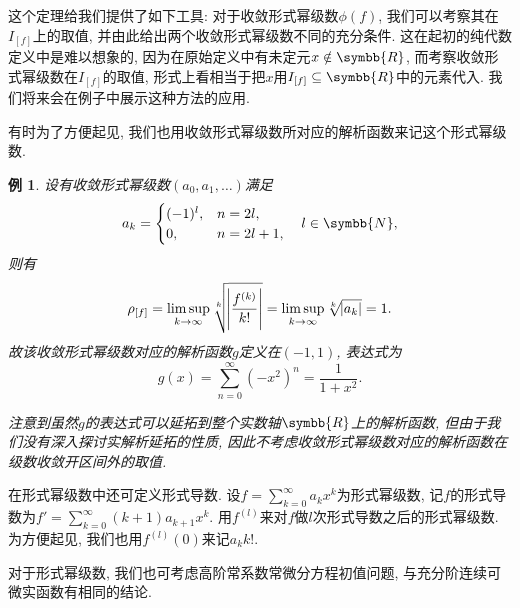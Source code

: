 \documentclass[chinese]{assignment}[2019/10/15]
\newcommand{\BR}{\symbb{R}}
\newcommand{\BN}{\symbb{N}}
\theoremstyle{plain}
\newtheorem{example}[theorem]{例}
\begin{document}
    这个定理给我们提供了如下工具: 对于收敛形式幂级数$\phi(f)$, 我们可以考察其在$I_{[f]}$上的取值, 并由此给出两个收敛形式幂级数不同的充分条件. 这在起初的纯代数定义中是难以想象的, 因为在原始定义中有未定元$x\notin\BR$, 而考察收敛形式幂级数在$I_{[f]}$的取值, 形式上看相当于把$x$用$I_{[f]}\subseteq\BR$中的元素代入. 我们将来会在例子中展示这种方法的应用.

    有时为了方便起见, 我们也用收敛形式幂级数所对应的解析函数来记这个形式幂级数.

    \begin{example}
        设有收敛形式幂级数$(a_0, a_1, \dotsc)$满足
        \begin{equation}
            a_k =
            \begin{cases}
                (-1)^l, &n=2l,\\
                0, &n=2l+1,
            \end{cases}
            \quad
            l \in \BN,
        \end{equation}
        则有
        \begin{equation}
            \rho_{[f]} = \limsup_{k\to\infty}\sqrt[k]{\abs{\frac{f^{(k)}}{k!}}} = \limsup_{k\to\infty}\sqrt[k]{\abs{a_k}} = 1.
        \end{equation}
        故该收敛形式幂级数对应的解析函数$g$定义在$(-1, 1)$, 表达式为
        \begin{equation}
            g(x) = \sum_{n=0}^{\infty}\left(-x^2\right)^n = \frac{1}{1+x^2}.
        \end{equation}

        注意到虽然$g$的表达式可以延拓到整个实数轴$\BR$上的解析函数, 但由于我们没有深入探讨实解析延拓的性质, 因此不考虑收敛形式幂级数对应的解析函数在级数收敛开区间外的取值.
    \end{example}

    在形式幂级数中还可定义形式导数. 设$f=\sum_{k=0}^\infty a_kx^k$为形式幂级数, 记$f$的形式导数为$f'=\sum_{k=0}^\infty (k+1)a_{k+1}x^k$. 用$f^{(l)}$来对$f$做$l$次形式导数之后的形式幂级数. 为方便起见, 我们也用$f^{(l)}(0)$来记$a_kk!$.

    对于形式幂级数, 我们也可考虑高阶常系数常微分方程初值问题, 与充分阶连续可微实函数有相同的结论.
\end{document}
